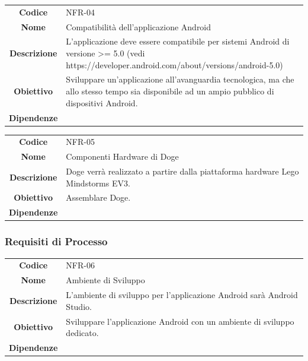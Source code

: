 \documentclass{article}
\begin{document}
\begin{adjustbox}{center}
\begin{tabular}{|c|p{10cm}|}
\hline
\textbf{Codice} & NFR-04 \\
\textbf{Nome} & Compatibilità dell'applicazione Android \\
\textbf{Descrizione} & L'applicazione deve essere compatibile per sistemi Android di versione >= 5.0 (vedi https://developer.android.com/about/versions/android-5.0) \\
\textbf{Obiettivo} & Sviluppare un'applicazione all'avanguardia tecnologica, ma che allo stesso tempo sia disponibile ad un ampio pubblico di dispositivi Android. \\
\textbf{Dipendenze} &  \\
\hline
\end{tabular}
\end{adjustbox}

\begin{adjustbox}{center}
\begin{tabular}{|c|p{10cm}|}
\hline
\textbf{Codice} & NFR-05 \\
\textbf{Nome} & Componenti Hardware di Doge \\
\textbf{Descrizione} & Doge verrà realizzato a partire dalla piattaforma hardware Lego Mindstorms EV3. \\
\textbf{Obiettivo} & Assemblare Doge. \\
\textbf{Dipendenze} &  \\
\hline
\end{tabular}
\end{adjustbox}

\subsubsection{Requisiti di Processo}

\begin{adjustbox}{center}
\begin{tabular}{|c|p{10cm}|}
\hline
\textbf{Codice} & NFR-06 \\
\textbf{Nome} & Ambiente di Sviluppo \\
\textbf{Descrizione} & L'ambiente di sviluppo per l'applicazione Android sarà Android Studio. \\
\textbf{Obiettivo} & Sviluppare l'applicazione Android con un ambiente di sviluppo dedicato. \\
\textbf{Dipendenze} &  \\
\hline
\end{tabular}
\end{adjustbox}
\end{document}
